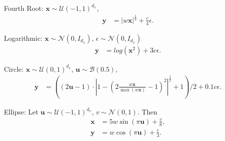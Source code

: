 \documentclass[11pt]{article}
\providecommand{\mb}[1]{\boldsymbol{#1}}
\providecommand{\mc}[1]{\mathcal{#1}}
\begin{document}
\begin{compactenum}
\item Fourth Root: $\mb{x} \sim \mc{U}(-1,1)^{d_{x}}$,
\begin{align*}
\mb{y}&=|w\mb{x}|^\frac{1}{4}+\frac{c}{4}\epsilon.
\end{align*}
\item Logarithmic: $\mb{x} \sim \mc{N}(0, I_{d_{x}})$, $\epsilon \sim \mc{N}(0, I_{d_{x}})$
\begin{align*}
\mb{y}&=log(\mb{x}^2)+3c\epsilon.
\end{align*}
\item Circle: $\mb{x} \sim \mc{U}(0,1)^{d_{x}}$, $\mb{u} \sim \mc{B}(0.5)$,
\begin{align*}
\mb{y}&=((2\mb{u}-1) \cdot |1-(2\frac{w\mb{x}}{\max(w\mb{x})}-1)^2|^{\frac{1}{2}}+1)/2+0.1c\epsilon.
\end{align*}
\item Ellipse: Let $\mb{u} \sim \mc{U}(-1,1)^{d_{x}}$, $v \sim \mc{N}(0,1)$. Then
\begin{align*}
\mb{x}&=5w\sin(\pi \mb{u})+\frac{v}{8},\\
\mb{y}&=w\cos(\pi \mb{u})+\frac{\epsilon}{3}.
\end{align*}


\end{compactenum}
\end{document}
